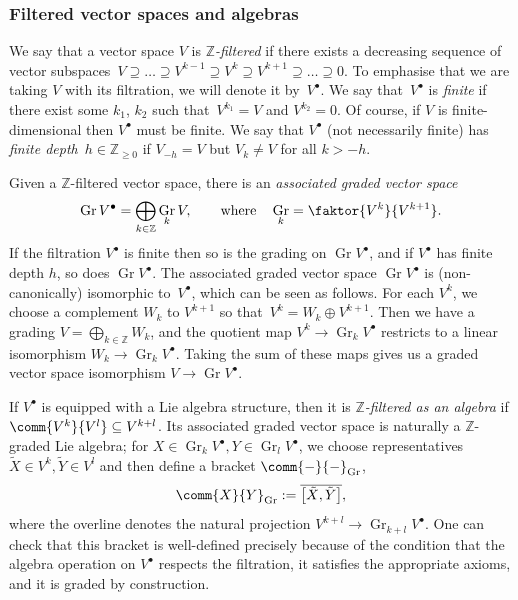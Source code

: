 \documentclass[10pt,a4paper]{amsart}
\numberwithin{equation}{section}
\newcommand{\ZZ}{\mathbb{Z}}
\newcommand{\1}{\mathbbm{1}}
\DeclareMathOperator{\Gr}{Gr}
\begin{document}
\subsubsection{Filtered vector spaces and algebras}
\label{sec:filtered-alg}

We say that a vector space $V$ is \emph{$\ZZ$-filtered} if there exists a decreasing sequence of vector subspaces~${V \supseteq \dots \supseteq V^{k-1} \supseteq V^k \supseteq V^{k+1} \supseteq \dots \supseteq 0}$.
To emphasise that we are taking $V$ with its filtration, we will denote it by~$V^\bullet$. We say that~$V^\bullet$ is \emph{finite} if there exist some $k_1$, $k_2$ such that~${V^{k_1}=V}$ and $V^{k_2}=0$. Of course, if $V$ is finite-dimensional then $V^\bullet$ must be finite. We say that $V^\bullet$ (not necessarily finite) has \emph{finite depth}~${h\in\ZZ_{\geq 0}}$ if $V_{-h} = V$ but $V_k\neq V$ for all $k>-h$.

Given a $\ZZ$-filtered vector space, there is an \emph{associated graded vector space}
\[
	\Gr V^\bullet = \bigoplus_{k\in\ZZ} \Gr_k V,\qquad \text{where}\quad \Gr_k = \faktor{V^k}{V^{k+1}}.
\]
If the filtration $V^\bullet$ is finite then so is the grading on $\Gr V^\bullet$, and if $V^\bullet$ has finite depth $h$, so does $\Gr V^\bullet$. The associated graded vector space $\Gr V^\bullet$ is (non-canonically) isomorphic to~$V^\bullet$, which can be seen as follows. For each $V^k$, we choose a complement $W_k$ to $V^{k+1}$ so that~${V^k=W_k\oplus V^{k+1}}$. Then we have a grading $V=\bigoplus_{k\in\ZZ} W_k$, and the quotient map $V^k\to\Gr_k V^\bullet$ restricts to a linear isomorphism $W_k\to\Gr_kV^\bullet$. Taking the sum of these maps gives us a graded vector space isomorphism $V\to\Gr V^\bullet $.

If $V^\bullet$ is equipped with a Lie algebra structure, then it is \emph{$\ZZ$-filtered as an algebra} if $\comm{V^k}{V^l}\subseteq V^{k+l}$. Its associated graded vector space is naturally a $\ZZ$-graded Lie algebra; for $X\in \Gr_k V^\bullet, Y\in \Gr_l V^\bullet$, we choose representatives $\tilde{X}\in V^k,\tilde{Y}\in V^l$ and then define a bracket $\comm{-}{-}_{\mathrm{Gr}}$,
\[
	\comm{X}{Y}_{\mathrm{Gr}} := \overline{\big[\tilde{X},\tilde{Y}\big]},
\]
where the overline denotes the natural projection $V^{k+l}\to\Gr_{k+l}V^\bullet$. One can check that this bracket is well-defined precisely because of the condition that the algebra operation on $V^\bullet$ respects the filtration, it satisfies the appropriate axioms, and it is graded by construction.
\end{document}
